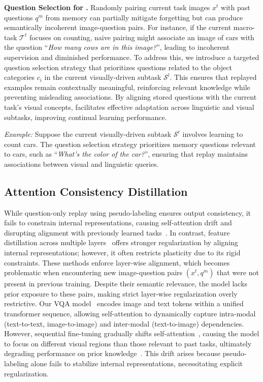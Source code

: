 \noindent\textbf{Question Selection for \qstmethodshort{}. }
Randomly pairing current task images \(x^{t}\) with past questions \(q^{m}\) from memory can partially mitigate forgetting but can produce semantically incoherent image-question pairs. 
For instance, if the current macro-task \(\mathcal{T}^t\) focuses on counting, naive pairing might associate an image of cars with the question ``\textit{How many cows are in this image?}'', leading to incoherent supervision and diminished performance. 
To address this, we introduce a targeted question selection strategy that prioritizes questions related to the object categories \(c_i\) in the current visually-driven subtask \(\mathcal{S}^l\). 
This ensures that replayed examples remain contextually meaningful, reinforcing relevant knowledge while preventing misleading associations. 
By aligning stored questions with the current task’s visual concepts, \qstmethodshort{} facilitates effective adaptation across linguistic and visual subtasks, improving continual learning performance.

\noindent \textit{Example:} Suppose the current visually-driven subtask 
$\mathcal{S}^t$ involves learning to count cars. The question selection strategy prioritizes memory questions relevant to cars, such as ``\textit{What’s the color of the car?}'', ensuring that replay maintains associations between visual and linguistic queries.

\subsection{Attention Consistency Distillation}
While question-only replay using pseudo-labeling ensures output consistency, it fails to constrain internal representations, causing self-attention drift and disrupting alignment with previously learned tasks~\citep{godey2024anisotropy, wang-etal-2022-learning, pelosin2022towards}. In contrast, feature distillation across multiple layers~\cite{Kang2022afc, xu2023multi,dhar2019learning, pelosin2022towards} offers stronger regularization by aligning internal representations; however, it often restricts plasticity due to its rigid constraints. These methods enforce layer-wise alignment, which becomes problematic when encountering new image-question pairs $(x^t, q^m)$ that were not present in previous training. Despite their semantic relevance, the model lacks prior exposure to these pairs, making strict layer-wise regularization overly restrictive. Our VQA model~\cite{zhang2023vqacl, nikandrou2022task} encodes image and text tokens within a unified transformer sequence, allowing self-attention to dynamically capture intra-modal (text-to-text, image-to-image) and inter-modal (text-to-image) dependencies. However, sequential fine-tuning gradually shifts self-attention~\cite{godey2024anisotropy, wang-etal-2022-learning}, causing the model to focus on different visual regions than those relevant to past tasks, ultimately degrading performance on prior knowledge~\cite{voita2019analyzing, godey2024anisotropy}. This drift arises because pseudo-labeling alone fails to stabilize internal representations, necessitating explicit regularization.

